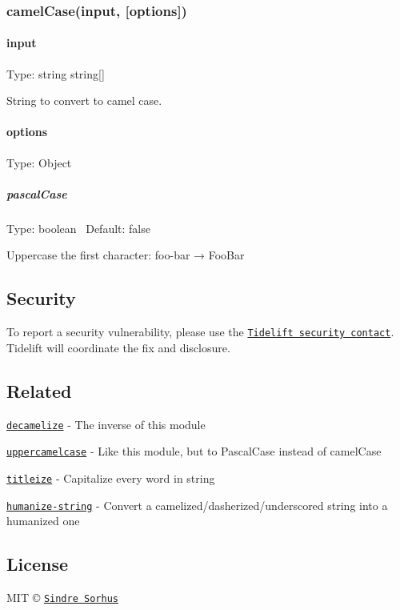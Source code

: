 \subsubsection*{camel\+Case(input, \mbox{[}options\mbox{]})}

\paragraph*{input}

Type\+: {\ttfamily string} {\ttfamily string\mbox{[}\mbox{]}}

String to convert to camel case.

\paragraph*{options}

Type\+: {\ttfamily Object}

\subparagraph*{pascal\+Case}

Type\+: {\ttfamily boolean}~\newline
 Default\+: {\ttfamily false}

Uppercase the first character\+: {\ttfamily foo-\/bar} → {\ttfamily Foo\+Bar}

\subsection*{Security}

To report a security vulnerability, please use the \href{https://tidelift.com/security}{\tt Tidelift security contact}. Tidelift will coordinate the fix and disclosure.

\subsection*{Related}


\begin{DoxyItemize}
\item \href{https://github.com/sindresorhus/decamelize}{\tt decamelize} -\/ The inverse of this module
\item \href{https://github.com/SamVerschueren/uppercamelcase}{\tt uppercamelcase} -\/ Like this module, but to Pascal\+Case instead of camel\+Case
\item \href{https://github.com/sindresorhus/titleize}{\tt titleize} -\/ Capitalize every word in string
\item \href{https://github.com/sindresorhus/humanize-string}{\tt humanize-\/string} -\/ Convert a camelized/dasherized/underscored string into a humanized one
\end{DoxyItemize}

\subsection*{License}

M\+IT © \href{https://sindresorhus.com}{\tt Sindre Sorhus} 